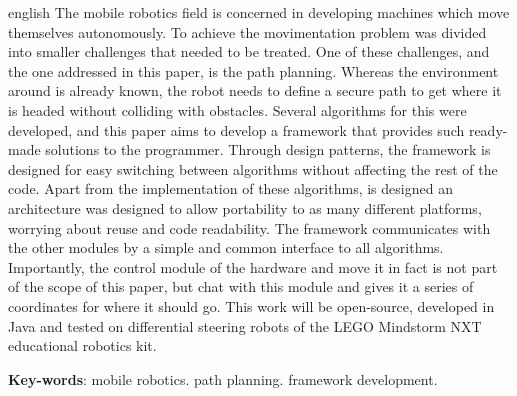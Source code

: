 \begin{resumo}[Abstract]
 \begin{otherlanguage*}{english}
   The mobile robotics field is concerned in developing machines which move themselves autonomously. To achieve the movimentation problem was divided into smaller challenges that needed to be treated. One of these challenges, and the one addressed in this paper, is the path planning. Whereas the environment around is already known, the robot needs to define a secure path to get where it is headed without colliding with obstacles. Several algorithms for this were developed, and this paper aims to develop a framework that provides such ready-made solutions to the programmer. Through design patterns, the framework is designed for easy switching between algorithms without affecting the rest of the code. Apart from the implementation of these algorithms, is designed an architecture was designed to allow portability to as many different platforms, worrying about reuse and code readability. The framework communicates with the other modules by a simple and common interface to all algorithms. Importantly, the control module of the hardware and move it in fact is not part of the scope of this paper, but chat with this module and gives it a series of coordinates for where it should go. This work will be open-source, developed in Java and tested on differential steering robots of the LEGO Mindstorm NXT educational robotics kit.

   \vspace{\onelineskip}
 
   \noindent 
   \textbf{Key-words}: mobile robotics. path planning. framework development.
 \end{otherlanguage*}
\end{resumo}
